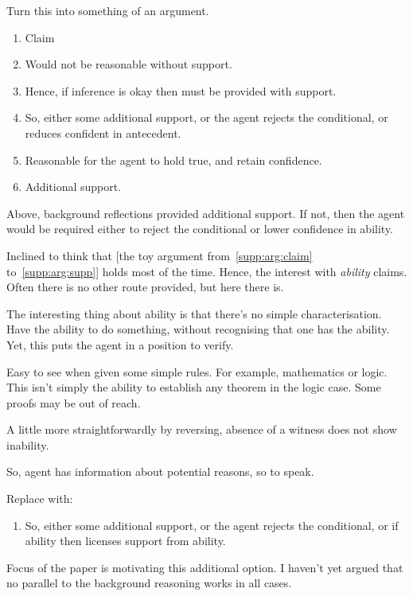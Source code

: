 \documentclass[10pt]{article}
\begin{document}
\begin{note}
  Turn this into something of an argument.
  \begin{enumerate}
  \item\label{supp:arg:claim} Claim
  \item\label{supp:arg:need-supp} Would not be reasonable without support.
  \item\label{supp:arg:supp} Hence, if inference is okay then must be provided with support.
  \item So, either some additional support, or the agent rejects the conditional, or reduces confident in antecedent.
  \item\label{supp:arg:reasonable} Reasonable for the agent to hold true, and retain confidence.
  \item Additional support.
  \end{enumerate}

  Above, background reflections provided additional support.
  If not, then the agent would be required either to reject the conditional or lower confidence in ability.

  Inclined to think that [the toy argument from~\ref{supp:arg:claim} to~\ref{supp:arg:supp}] holds most of the time.
  Hence, the interest with \emph{ability} claims.
  Often there is no other route provided, but here there is.

  The interesting thing about ability is that there's no simple characterisation.
  Have the ability to do something, without recognising that one has the ability.
  Yet, this puts the agent in a position to verify.

  Easy to see when given some simple rules.
  For example, mathematics or logic.
  This isn't simply the ability to establish any theorem in the logic case.
  Some proofs may be out of reach.

  A little more straightforwardly by reversing, absence of a witness does not show inability.

  So, agent has information about potential reasons, so to speak.

  Replace with:
  \begin{enumerate}
  \item So, either some additional support, or the agent rejects the conditional, or if ability then licenses support from ability.
  \end{enumerate}

  Focus of the paper is motivating this additional option.
  I haven't yet argued that no parallel to the background reasoning works in all cases.


\end{note}
\end{document}
